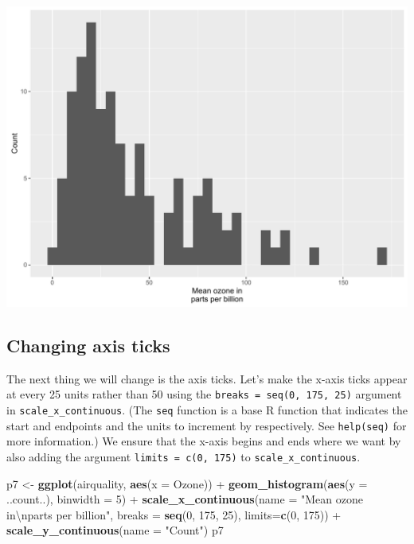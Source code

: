 \documentclass[]{article}
\newenvironment{Shaded}{\begin{snugshade}}{\end{snugshade}}
\newcommand{\KeywordTok}[1]{\textcolor[rgb]{0.13,0.29,0.53}{\textbf{{#1}}}}
\newcommand{\DataTypeTok}[1]{\textcolor[rgb]{0.13,0.29,0.53}{{#1}}}
\newcommand{\DecValTok}[1]{\textcolor[rgb]{0.00,0.00,0.81}{{#1}}}
\newcommand{\CharTok}[1]{\textcolor[rgb]{0.31,0.60,0.02}{{#1}}}
\newcommand{\StringTok}[1]{\textcolor[rgb]{0.31,0.60,0.02}{{#1}}}
\newcommand{\NormalTok}[1]{{#1}}
\begin{document}
\begin{center}\includegraphics{0_all_posts_pdf/histogram_6-1} \end{center}

\subsection{Changing axis ticks}\label{changing-axis-ticks}

The next thing we will change is the axis ticks. Let's make the x-axis
ticks appear at every 25 units rather than 50 using the
\texttt{breaks\ =\ seq(0,\ 175,\ 25)} argument in
\texttt{scale\_x\_continuous}. (The \texttt{seq} function is a base R
function that indicates the start and endpoints and the units to
increment by respectively. See \texttt{help(seq)} for more information.)
We ensure that the x-axis begins and ends where we want by also adding
the argument \texttt{limits\ =\ c(0,\ 175)} to
\texttt{scale\_x\_continuous}.

\begin{Shaded}
\begin{Highlighting}[]
\NormalTok{p7 <-}\StringTok{ }\KeywordTok{ggplot}\NormalTok{(airquality, }\KeywordTok{aes}\NormalTok{(}\DataTypeTok{x =} \NormalTok{Ozone)) +}\StringTok{ }
\StringTok{      }\KeywordTok{geom_histogram}\NormalTok{(}\KeywordTok{aes}\NormalTok{(}\DataTypeTok{y =} \NormalTok{..count..), }\DataTypeTok{binwidth =} \DecValTok{5}\NormalTok{) +}
\StringTok{      }\KeywordTok{scale_x_continuous}\NormalTok{(}\DataTypeTok{name =} \StringTok{"Mean ozone in}\CharTok{\textbackslash{}n}\StringTok{parts per billion"}\NormalTok{,}
                         \DataTypeTok{breaks =} \KeywordTok{seq}\NormalTok{(}\DecValTok{0}\NormalTok{, }\DecValTok{175}\NormalTok{, }\DecValTok{25}\NormalTok{),}
                         \DataTypeTok{limits=}\KeywordTok{c}\NormalTok{(}\DecValTok{0}\NormalTok{, }\DecValTok{175}\NormalTok{)) +}
\StringTok{      }\KeywordTok{scale_y_continuous}\NormalTok{(}\DataTypeTok{name =} \StringTok{"Count"}\NormalTok{)}
\NormalTok{p7}
\end{Highlighting}
\end{Shaded}
\end{document}

